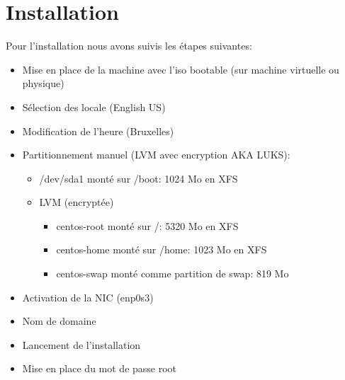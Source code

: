 \section{Installation}
Pour l'installation nous avons suivis les étapes suivantes:
\begin{itemize}
	\item Mise en place de la machine avec l'iso bootable (sur machine virtuelle ou physique)
	\item Sélection des locale (English US)
	\item Modification de l'heure (Bruxelles)
	\item Partitionnement manuel (LVM avec encryption AKA LUKS):
	\begin{itemize}
		\item /dev/sda1 monté sur /boot: 1024 Mo en XFS
		\item LVM (encryptée)
		\begin{itemize}
			\item centos-root monté sur /: 5320 Mo en XFS
			\item centos-home monté sur /home: 1023 Mo en XFS
			\item centos-swap monté comme partition de swap: 819 Mo
		\end{itemize}
	\end{itemize}
	\item Activation de la NIC (enp0s3)
	\item Nom de domaine
	\item Lancement de l'installation
	\item Mise en place du mot de passe root
\end{itemize}


